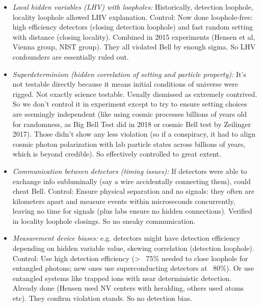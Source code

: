 \documentclass[11pt]{article}
\begin{document}
\begin{itemize}

\item 
\textit{Local hidden variables (LHV) with loopholes:} Historically, detection loophole, locality loophole allowed LHV explanation. Control: Now done loophole-free: high efficiency detectors (closing detection loophole) and fast random setting with distance (closing locality). Combined in 2015 experiments (Hensen et al, Vienna group, NIST group). They all violated Bell by enough sigma. So LHV confounders are essentially ruled out.




\item 
\textit{Superdeterminism (hidden correlation of setting and particle property):} It's not testable directly because it means initial conditions of universe were rigged. Not exactly science testable. Usually dismissed as extremely contrived. So we don't control it in experiment except to try to ensure setting choices are seemingly independent (like using cosmic processes billions of years old for randomness, as Big Bell Test did in 2018 or cosmic Bell test by Zeilinger 2017). Those didn't show any less violation (so if a conspiracy, it had to align cosmic photon polarization with lab particle states across billions of years, which is beyond credible). So effectively controlled to great extent.




\item 
\textit{Communication between detectors (timing issues):} If detectors were able to exchange info subluminally (say a wire accidentally connecting them), could cheat Bell. Control: Ensure physical separation and no signals: they often are kilometers apart and measure events within microseconds concurrently, leaving no time for signals (plus labs ensure no hidden connections). Verified in locality loophole closings. So no sneaky communication.




\item 
\textit{Measurement device biases:} e.g. detectors might have detection efficiency depending on hidden variable value, skewing correlation (detection loophole). Control: Use high detection efficiency (> ~75\% needed to close loophole for entangled photons; new ones use superconducting detectors at ~80\%). Or use entangled systems like trapped ions with near deterministic detection. Already done (Hensen used NV centers with heralding, others used atoms etc). They confirm violation stands. So no detection bias.





\end{itemize}
\end{document}
